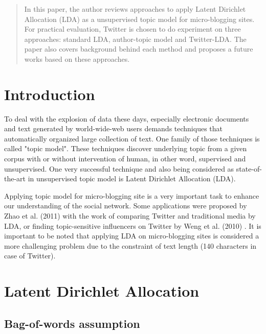 \documentclass[conference,compsoc]{IEEEtran}
\begin{document}
\maketitle

\begin{abstract}
In this paper, the author reviews approaches to apply Latent Dirichlet Allocation (LDA) as a unsupervised topic model for micro-blogging sites. For practical evaluation, Twitter is chosen to do experiment on three approaches: standard LDA, author-topic model and Twitter-LDA. The paper also covers background behind each method and proposes a future works based on these approaches.
\end{abstract}


\section{Introduction}
To deal with the explosion of data these days, especially electronic documents and text generated by world-wide-web users demands techniques that automatically organized large collection of text. One family of those techniques is called "topic model". These techniques discover underlying topic from a given corpus with or without intervention of human, in other word, supervised and unsupervised. One very successful technique and also being considered as state-of-the-art in unsupervised topic model is Latent Dirichlet Allocation (LDA)\cite{Blei2003}.

Applying topic model for micro-blogging site is a very important task to enhance our understanding of the social network. Some applications were proposed by Zhao et al. (2011) \cite{zhao2011comparing} with the work of comparing Twitter and traditional media by LDA, or finding topic-sensitive influencers on Twitter by Weng et al. (2010) \cite{Weng2010}. It is important to be noted that applying LDA on micro-blogging sites is considered a more challenging problem due to the constraint of text length (140 characters in case of Twitter).

\section{Latent Dirichlet Allocation}

\subsection{Bag-of-words assumption}
\end{document}
